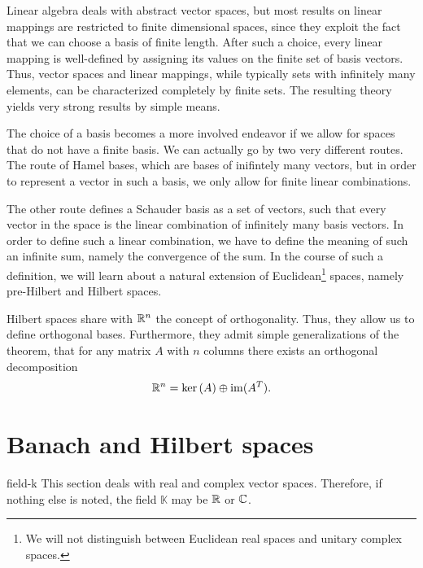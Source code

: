 
\begin{intro}
  Linear algebra deals with abstract vector spaces, but most results
  on linear mappings are restricted to finite dimensional spaces,
  since they exploit the fact that we can choose a basis of finite
  length. After such a choice, every linear mapping is well-defined by
  assigning its values on the finite set of basis vectors. Thus,
  vector spaces and linear mappings, while typically sets with
  infinitely many elements, can be characterized completely by finite
  sets. The resulting theory yields very strong results by simple means.

  The choice of a basis becomes a more involved endeavor if we allow
  for spaces that do not have a finite basis. We can actually go by
  two very different routes. The route of Hamel bases, which are bases
  of inifintely many vectors, but in order to represent a vector in
  such a basis, we only allow for finite linear combinations.
  
  The other route defines a Schauder basis as a set of vectors, such
  that every vector in the space is the linear combination of
  infinitely many basis vectors. In order to define such a linear
  combination, we have to define the meaning of such an infinite sum,
  namely the convergence of the sum. In the course of such a
  definition, we will learn about a natural extension of
  Euclidean\footnote{We will not distinguish between
    Euclidean real spaces and unitary complex spaces.}
  spaces, namely pre-Hilbert and Hilbert spaces.

  Hilbert spaces share with $\mathbb R^n$ the concept of orthogonality. Thus,
  they allow us to define orthogonal bases. Furthermore, they admit
  simple generalizations of the theorem, that for any matrix $A$ with
  $n$ columns there exists an orthogonal decomposition
  \begin{gather}
    \mathbb R^n = \operatorname{ker}\left(A\right) \oplus \operatorname{im}(A^T).
  \end{gather}
\end{intro}

\section{Banach and Hilbert spaces}

\begin{Notation}{field-k}
  This section deals with real and complex vector spaces. Therefore,
  if nothing else is noted, the field $\mathbb K$ may be $\mathbb R$ or $\mathbb C$.
\end{Notation}

